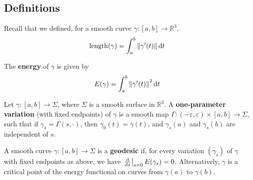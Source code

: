 \documentclass[a4paper]{article}
\begin{document}
\subsection{Definitions}
Recall that we defined, for a smooth curve \( \gamma \colon [a,b] \to \mathbb R^3 \),
\[
	\mathrm{length}(\gamma) = \int_a^b \norm{\gamma'(t)} \dd{t}
\]
\begin{definition}
	The \textbf{energy} of \( \gamma \) is given by
	\[
		E(\gamma) = \int_a^b \norm{\gamma'(t)}^2 \dd{t}
	\]
\end{definition}
\begin{definition}
	Let \( \gamma \colon [a,b] \to \Sigma \), where \( \Sigma \) is a smooth surface in \( \mathbb R^3 \).
	A \textbf{one-parameter variation} (with fixed endpoints) of \( \gamma \) is a smooth map \( \Gamma \colon (-\varepsilon, \varepsilon) \times [a,b] \to \Sigma \), such that if \( \gamma_s = \Gamma(s,\cdot) \), then
	\( \gamma_0(t) = \gamma(t) \), and \( \gamma_s(a) \) and \( \gamma_s(b) \) are independent of \( s \).
\end{definition}
\begin{definition}
	A smooth curve \( \gamma \colon [a,b] \to \Sigma \) is a \textbf{geodesic} if, for every variation \( (\gamma_s) \) of \( \gamma \) with fixed endpoints as above, we have \( \eval{\dv{s}}_{s=0} E(\gamma_s) = 0 \).
	Alternatively, \( \gamma \) is a critical point of the energy functional on curves from \( \gamma(a) \) to \( \gamma(b) \).
\end{definition}
\end{document}

